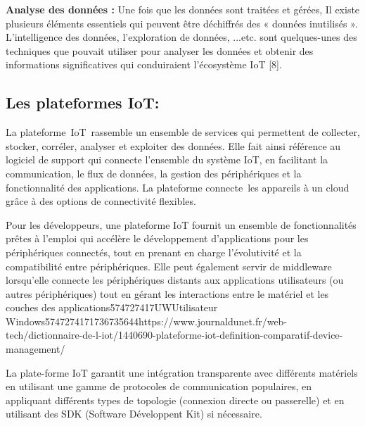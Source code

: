 \documentclass[12pt,a4paper]{report}
\begin{document}
\noindent 
\begin{flushleft}
	\textbf{Analyse des donn\'{e}es : }Une fois que les donn\'{e}es sont trait\'{e}es et g\'{e}r\'{e}es, Il existe plusieurs \'{e}l\'{e}ments essentiels qui peuvent \^{e}tre d\'{e}chiffr\'{e}s des « donn\'{e}es inutilis\'{e}s ». L'intelligence des donn\'{e}es, l'exploration de donn\'{e}es, ...etc. sont quelques-unes des techniques que pouvait utiliser pour analyser les donn\'{e}es et obtenir des informations significatives qui conduiraient l'\'{e}cosyst\`{e}me IoT [8].
	
	\subsection{Les plateformes IoT:}
	La plateforme~IoT~rassemble un ensemble de services qui permettent de collecter, stocker, corr\'{e}ler, analyser et exploiter des donn\'{e}es. Elle fait ainsi r\'{e}f\'{e}rence au logiciel de support qui connecte l'ensemble du syst\`{e}me IoT, en facilitant la communication, le flux de donn\'{e}es, la gestion des p\'{e}riph\'{e}riques et la fonctionnalit\'{e} des applications. La plateforme connecte~les appareils \`{a} un cloud gr\^{a}ce \`{a} des options de connectivit\'{e} flexibles. 
	
	\noindent Pour les d\'{e}veloppeurs, une plateforme IoT fournit un ensemble de fonctionnalit\'{e}s pr\^{e}tes \`{a} l'emploi qui acc\'{e}l\`{e}re le d\'{e}veloppement d'applications pour les p\'{e}riph\'{e}riques connect\'{e}s, tout en prenant en charge l'\'{e}volutivit\'{e} et la compatibilit\'{e} entre p\'{e}riph\'{e}riques. Elle peut \'{e}galement servir de middleware lorsqu'elle connecte les p\'{e}riph\'{e}riques distants aux applications utilisateurs (ou autres p\'{e}riph\'{e}riques) tout en g\'{e}rant les interactions entre le mat\'{e}riel et les couches des applications574727417UWUtilisateur Windows5747274171736735644https://www.journaldunet.fr/web-tech/dictionnaire-de-l-iot/1440690-plateforme-iot-definition-comparatif-device-management/
	
	\noindent 
	
	\noindent 
	
	\noindent La plate-forme IoT garantit une int\'{e}gration transparente avec diff\'{e}rents mat\'{e}riels en utilisant une gamme de protocoles de communication populaires, en appliquant diff\'{e}rents types de topologie (connexion directe ou passerelle) et en utilisant des SDK (Software D\'{e}veloppent Kit) si n\'{e}cessaire.
	
	\noindent 
	

\end{flushleft}
\end{document}
